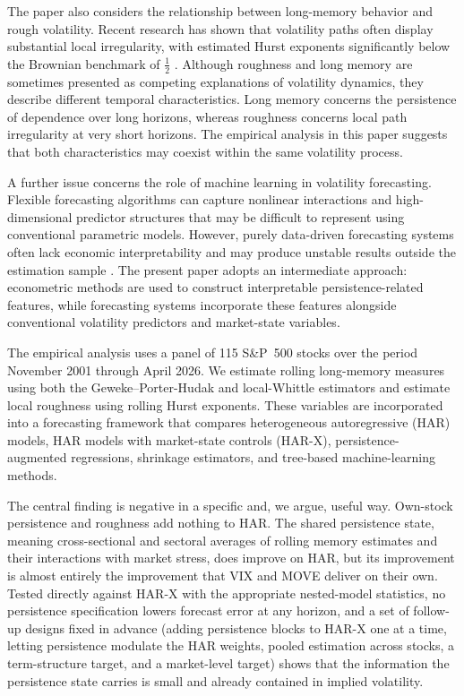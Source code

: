 \documentclass[jrfm,article,submit,moreauthors,pdftex]{Definitions/mdpi}
\begin{document}
The paper also considers the relationship between long-memory behavior and
rough volatility. Recent research has shown that volatility paths often
display substantial local irregularity, with estimated Hurst exponents
significantly below the Brownian benchmark of $\frac{1}{2}$
\citep{gatheral2018volatility,bennedsen2021decoupling}. Although roughness
and long memory are sometimes presented as competing explanations of
volatility dynamics, they describe different temporal characteristics. Long
memory concerns the persistence of dependence over long horizons, whereas
roughness concerns local path irregularity at very short horizons. The
empirical analysis in this paper suggests that both characteristics may
coexist within the same volatility process.

A further issue concerns the role of machine learning in volatility
forecasting. Flexible forecasting algorithms can capture nonlinear
interactions and high-dimensional predictor structures that may be difficult
to represent using conventional parametric models. However, purely
data-driven forecasting systems often lack economic interpretability and may
produce unstable results outside the estimation sample
\citep{gu2020empirical}. The present paper adopts an intermediate approach:
econometric methods are used to construct interpretable persistence-related
features, while forecasting systems incorporate these features alongside
conventional volatility predictors and market-state variables.

The empirical analysis uses a panel of 115 S\&P~500 stocks over the period
November 2001 through April 2026. We estimate rolling long-memory measures
using both the Geweke--Porter-Hudak and local-Whittle estimators and
estimate local roughness using rolling Hurst exponents. These variables are
incorporated into a forecasting framework that compares heterogeneous
autoregressive (HAR) models, HAR models with market-state controls (HAR-X),
persistence-augmented regressions, shrinkage estimators, and tree-based
machine-learning methods.

The central finding is negative in a specific and, we argue, useful
way. Own-stock persistence and roughness add nothing to HAR. The shared
persistence state, meaning cross-sectional and sectoral averages of rolling
memory estimates and their interactions with market stress, does improve on
HAR, but its improvement is almost entirely the improvement that VIX and
MOVE deliver on their own. Tested directly against HAR-X with the
appropriate nested-model statistics, no persistence specification lowers
forecast error at any horizon, and a set of follow-up designs fixed in
advance (adding persistence blocks to HAR-X one at a time, letting
persistence modulate the HAR weights, pooled estimation across stocks, a
term-structure target, and a market-level target) shows that the
information the persistence state carries is small and already contained
in implied volatility.
\end{document}
